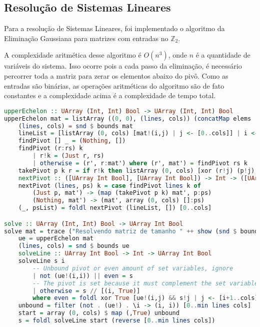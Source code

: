 \documentclass{article}
\begin{document}
\subsection{Resolução de Sistemas Lineares}
\label{matrixSolver}

Para a resolução de Sistemas Lineares, foi implementado o algoritmo da Eliminação Gaussiana para matrizes com entradas no $\mathbb{Z}_2$.

A complexidade aritmética desse algoritmo é $O(n^3)$, onde $n$ é a quantidade de variáveis do sistema.
Isso ocorre pois a cada passo da eliminação, é necessário percorrer toda a matriz para zerar os elementos abaixo do pivô.
Como as entradas são binárias, as operações aritméticas do algoritmo são de fato constantes e a complexidade acima é a complexidade de tempo total.

\begin{minipage}{.9\linewidth}
\begin{lstlisting}[language=haskell,caption=Eliminação Gaussiana]
upperEchelon :: UArray (Int, Int) Bool -> UArray (Int, Int) Bool
upperEchelon mat = listArray ((0, 0), (lines, cols)) (concatMap elems . reverse $ psList) where
    (lines, cols) = snd $ bounds mat
    lineList = [listArray (0, cols) [mat!(i,j) | j <- [0..cols]] | i <- [0..lines]]
    findPivot [] _ = (Nothing, [])
    findPivot (r:rs) k
        | r!k = (Just r, rs)
        | otherwise = (r', r:mat') where (r', mat') = findPivot rs k
    takePivot p k r = if r!k then listArray (0, cols) [xor (r!j) (p!j) | j <- [0..cols]] else r
    nextPivot :: ([UArray Int Bool], [UArray Int Bool]) -> Int -> ([UArray Int Bool], [UArray Int Bool])
    nextPivot (lines, ps) k = case findPivot lines k of
        (Just p, mat') -> (map (takePivot p k) mat', p:ps)
        (Nothing, mat') -> (mat', array (0, cols) []:ps)
    (_, psList) = foldl nextPivot (lineList, []) [0..cols]

solve :: UArray (Int, Int) Bool -> UArray Int Bool
solve mat = trace ("Resolvendo matriz de tamanho " ++ show (snd $ bounds mat)) s where
    ue = upperEchelon mat
    (lines, cols) = snd $ bounds ue
    solveLine :: UArray Int Bool -> Int -> UArray Int Bool
    solveLine s i
        -- Unbound pivot or even amount of set variables, ignore
        | not (ue!(i,i)) || even = s
        -- The pivot is set because it must complement the set variables and result in zero
        | otherwise = s // [(i, True)]
        where even = foldl xor True [ue!(i,j) && s!j | j <- [i+1..cols]]
    unbound = filter (not . (ue!) . \i -> (i, i)) [0..min lines cols]
    start = array (0, cols) $ map (,True) unbound
    s = foldl solveLine start (reverse [0..min lines cols])

\end{lstlisting}
\end{minipage}
\end{document}
